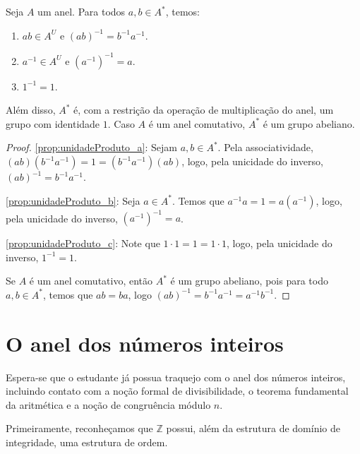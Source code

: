 \begin{prop}
Seja $A$ um anel. Para todos $a, b \in A^*$, temos:
\begin{enumerate}[label=\alph*)]
    \item $ab\in A^U$ e $(ab)^{-1}=b^{-1}a^{-1}$.\label{prop:unidadeProduto_a}
    \item $a^{-1}\in A^U$ e $(a^{-1})^{-1}=a$.\label{prop:unidadeProduto_b}
    \item $1^{-1}=1$.\label{prop:unidadeProduto_c}
\end{enumerate}
Além disso, $A^*$ é, com a restrição da operação de multiplicação do anel, um grupo com identidade $1$. Caso $A$ é um anel comutativo, $A^*$ é um grupo abeliano.
\end{prop}
\begin{proof}
    \ref{prop:unidadeProduto_a}: Sejam $a, b \in A^*$. Pela associatividade, $(ab)(b^{-1}a^{-1})=1=(b^{-1}a^{-1})(ab)$, logo, pela unicidade do inverso, $(ab)^{-1}=b^{-1}a^{-1}$.

    \ref{prop:unidadeProduto_b}: Seja $a \in A^*$. Temos que $a^{-1}a=1=a(a^{-1})$, logo, pela unicidade do inverso, $(a^{-1})^{-1}=a$.

    \ref{prop:unidadeProduto_c}: Note que $1\cdot 1=1=1\cdot 1$, logo, pela unicidade do inverso, $1^{-1}=1$.

    Se $A$ é um anel comutativo, então $A^*$ é um grupo abeliano, pois para todo $a, b \in A^*$, temos que $ab=ba$, logo $(ab)^{-1}=b^{-1}a^{-1}=a^{-1}b^{-1}$.
\end{proof}
\section{O anel dos números inteiros}
Espera-se que o estudante já possua traquejo com o anel dos números inteiros, incluindo contato com a noção formal de divisibilidade, o teorema fundamental da aritmética e a noção de congruência módulo $n$.

Primeiramente, reconheçamos que $\mathbb Z$ possui, além da estrutura de domínio de integridade, uma estrutura de ordem.

